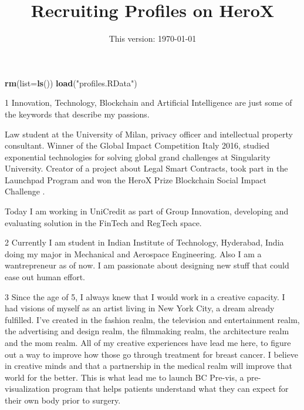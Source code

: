 \documentclass[12pt, titlepage]{article}
\institute{}
\title{Recruiting Profiles on HeroX}
\author{This version: \today}
\newenvironment{Shaded}{\begin{snugshade}}{\end{snugshade}}
\newcommand{\KeywordTok}[1]{\textcolor[rgb]{0.12,0.11,0.11}{\textbf{#1}}}
\newcommand{\DataTypeTok}[1]{\textcolor[rgb]{0.00,0.34,0.68}{#1}}
\newcommand{\DecValTok}[1]{\textcolor[rgb]{0.69,0.50,0.00}{#1}}
\newcommand{\CharTok}[1]{\textcolor[rgb]{0.57,0.30,0.62}{#1}}
\newcommand{\StringTok}[1]{\textcolor[rgb]{0.75,0.01,0.01}{#1}}
\newcommand{\OtherTok}[1]{\textcolor[rgb]{0.00,0.43,0.16}{#1}}
\newcommand{\OperatorTok}[1]{\textcolor[rgb]{0.12,0.11,0.11}{#1}}
\newcommand{\NormalTok}[1]{\textcolor[rgb]{0.12,0.11,0.11}{#1}}
\begin{document}
\maketitle


\clearpage

\begin{Shaded}
\begin{Highlighting}[]
\KeywordTok{rm}\NormalTok{(}\DataTypeTok{list=}\KeywordTok{ls}\NormalTok{())}
\KeywordTok{load}\NormalTok{(}\StringTok{"profiles.RData"}\NormalTok{)}
\end{Highlighting}
\end{Shaded}

\begin{Shaded}
\end{Shaded}

1 Innovation, Technology, Blockchain and Artificial Intelligence are
just some of the keywords that describe my passions.

Law student at the University of Milan, privacy officer and intellectual
property consultant. Winner of the Global Impact Competition Italy 2016,
studied exponential technologies for solving global grand challenges at
Singularity University. Creator of a project about Legal Smart
Contracts, took part in the Launchpad Program and won the HeroX Prize
Blockchain Social Impact Challenge .

Today I am working in UniCredit as part of Group Innovation, developing
and evaluating solution in the FinTech and RegTech space.

2 Currently I am student in Indian Institute of Technology, Hyderabad,
India doing my major in Mechanical and Aerospace Engineering. Also I am
a wantrepreneur as of now. I am passionate about designing new stuff
that could ease out human effort.

3 Since the age of 5, I always knew that I would work in a creative
capacity. I had visions of myself as an artist living in New York City,
a dream already fulfilled. I've created in the fashion realm, the
television and entertainment realm, the advertising and design realm,
the filmmaking realm, the architecture realm and the mom realm. All of
my creative experiences have lead me here, to figure out a way to
improve how those go through treatment for breast cancer. I believe in
creative minds and that a partnership in the medical realm will improve
that world for the better. This is what lead me to launch BC Pre-vis, a
pre-visualization program that helps patients understand what they can
expect for their own body prior to surgery.
\end{document}
